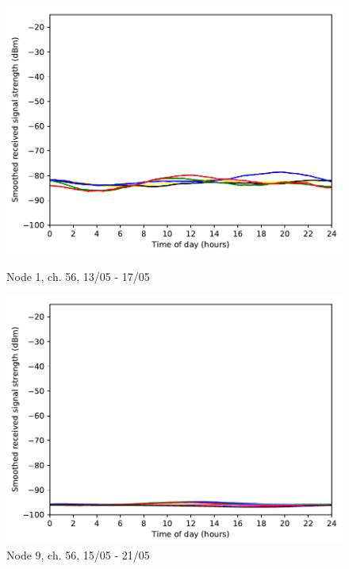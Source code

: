 \documentclass[a4paper, 11pt]{article}
\begin{document}
\begin{figure}[ht]
\begin{minipage}{0.47\textwidth}
	\centering
	\includegraphics[width=\textwidth]{images/5_GHz/node1_2017-05-17_chan56_image.pdf}
	\caption{Node 1, ch. 56, 13/05 - 17/05}
	\label{node1_5ghz_traffic_chan56}
\end{minipage}\hfill
\begin{minipage}{0.47\textwidth}
    \centering
	\includegraphics[width=\textwidth]{images/5_GHz/cot-node9-student_2017-05-21_chan56_image.pdf}
    \caption{Node 9, ch. 56, 15/05 - 21/05} \label{node9_5ghz_traffic_chan56}
\end{minipage}\hfill
\end{figure}
\end{document}
